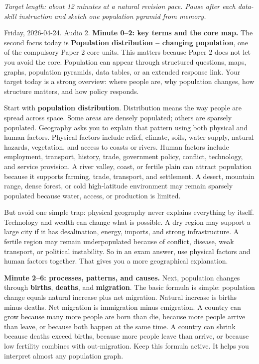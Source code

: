 \documentclass[11pt,a4paper]{article}
\newcommand{\term}[1]{\textcolor{HeadingBlue}{\textbf{#1}}}
\begin{document}
\textit{Target length: about 12 minutes at a natural revision pace. Pause after
each data-skill instruction and sketch one population pyramid from memory.}

Friday, 2026-04-24. Audio 2.
\textbf{Minute 0--2: key terms and the core map.}
The second focus today is \term{Population distribution -- changing population},
one of the compulsory Paper 2 core units. This matters because Paper 2 does not
let you avoid the core. Population can appear through structured questions,
maps, graphs, population pyramids, data tables, or an extended response link.
Your target today is a strong overview: where people are, why population changes,
how structure matters, and how policy responds.

Start with \term{population distribution}. Distribution means the way people are
spread across space. Some areas are densely populated; others are sparsely
populated. Geography asks you to explain that pattern using both physical and
human factors. Physical factors include relief, climate, soils, water supply,
natural hazards, vegetation, and access to coasts or rivers. Human factors
include employment, transport, history, trade, government policy, conflict,
technology, and service provision. A river valley, coast, or fertile plain can
attract population because it supports farming, trade, transport, and settlement.
A desert, mountain range, dense forest, or cold high-latitude environment may
remain sparsely populated because water, access, or production is limited.

But avoid one simple trap: physical geography never explains everything by
itself. Technology and wealth can change what is possible. A dry region may
support a large city if it has desalination, energy, imports, and strong
infrastructure. A fertile region may remain underpopulated because of conflict,
disease, weak transport, or political instability. So in an exam answer, use
physical factors and human factors together. That gives you a more geographical
explanation.

\textbf{Minute 2--6: processes, patterns, and causes.}
Next, population changes through \term{births}, \term{deaths}, and
\term{migration}. The basic formula is simple: population change equals natural
increase plus net migration. Natural increase is births minus deaths. Net
migration is immigration minus emigration. A country can grow because many more
people are born than die, because more people arrive than leave, or because both
happen at the same time. A country can shrink because deaths exceed births,
because more people leave than arrive, or because low fertility combines with
out-migration. Keep this formula active. It helps you interpret almost any
population graph.
\end{document}
